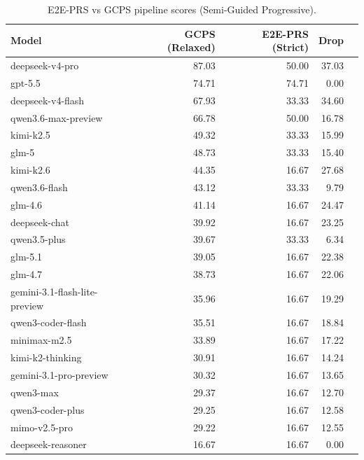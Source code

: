 \begin{table}[!t]
\centering
\caption{E2E-PRS vs GCPS pipeline scores (Semi-Guided Progressive).}
\small
\begin{tabular}{lrrrr}
\toprule
\textbf{Model} & \textbf{GCPS (Relaxed)} & \textbf{E2E-PRS (Strict)} & \textbf{Drop} \\
\midrule
deepseek-v4-pro & 87.03 & 50.00 & 37.03 \\
gpt-5.5 & 74.71 & 74.71 & 0.00 \\
deepseek-v4-flash & 67.93 & 33.33 & 34.60 \\
qwen3.6-max-preview & 66.78 & 50.00 & 16.78 \\
kimi-k2.5 & 49.32 & 33.33 & 15.99 \\
glm-5 & 48.73 & 33.33 & 15.40 \\
kimi-k2.6 & 44.35 & 16.67 & 27.68 \\
qwen3.6-flash & 43.12 & 33.33 & 9.79 \\
glm-4.6 & 41.14 & 16.67 & 24.47 \\
deepseek-chat & 39.92 & 16.67 & 23.25 \\
qwen3.5-plus & 39.67 & 33.33 & 6.34 \\
glm-5.1 & 39.05 & 16.67 & 22.38 \\
glm-4.7 & 38.73 & 16.67 & 22.06 \\
gemini-3.1-flash-lite-preview & 35.96 & 16.67 & 19.29 \\
qwen3-coder-flash & 35.51 & 16.67 & 18.84 \\
minimax-m2.5 & 33.89 & 16.67 & 17.22 \\
kimi-k2-thinking & 30.91 & 16.67 & 14.24 \\
gemini-3.1-pro-preview & 30.32 & 16.67 & 13.65 \\
qwen3-max & 29.37 & 16.67 & 12.70 \\
qwen3-coder-plus & 29.25 & 16.67 & 12.58 \\
mimo-v2.5-pro & 29.22 & 16.67 & 12.55 \\
deepseek-reasoner & 16.67 & 16.67 & 0.00 \\
\bottomrule
\end{tabular}
\label{tab:scoring_comparison}
\end{table}
